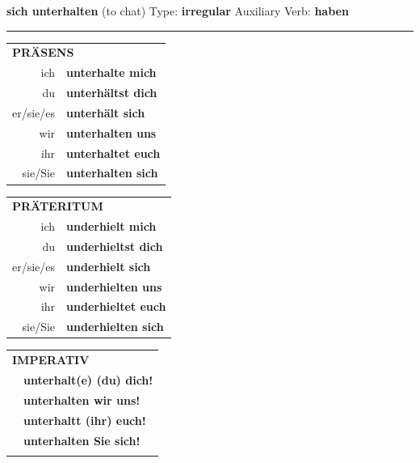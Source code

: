 \documentclass[10pt,a4paper]{revtex4-2}
\begin{document}
\begin{verbbox}
        {\Large \bf sich unterhalten} (to chat) \hfill Type: \textbf{irregular} \hfill Auxiliary Verb: \textbf{haben} 
    
       \vspace{5pt}

    \hrule
    
    \vspace{5pt}

  \begin{tabular}{rl}
     \multicolumn{2}{l}{\textbf{PRÄSENS} }\\
    ich & \textbf{unterhalte mich}\\
    du & \textbf{unterhältst dich}\\
    er/sie/es & \textbf{unterhält sich}\\
    wir & \textbf{unterhalten uns}\\
    ihr & \textbf{unterhaltet euch}\\
    sie/Sie & \textbf{unterhalten sich}\\
  \end{tabular}
  \hfill
     \begin{tabular}{rl}
    \multicolumn{2}{l}{\textbf{PRÄTERITUM} }\\
    ich & \textbf{underhielt mich}\\
    du & \textbf{underhieltst dich}\\
    er/sie/es & \textbf{underhielt sich}\\
    wir & \textbf{underhielten uns}\\
    ihr & \textbf{underhieltet euch}\\
    sie/Sie & \textbf{underhielten sich}\\
  \end{tabular}
  \hfill
  \begin{tabular}{rl}
     \multicolumn{2}{l}{\textbf{IMPERATIV} }\\
   & \textbf{unterhalt(e) (du) dich!}\\
   & \textbf{unterhalten wir uns!}\\
   & \textbf{unterhaltt (ihr) euch!}\\
   & \textbf{unterhalten Sie sich!}\\
   & \vspace{10pt}
  \end{tabular}

    \vspace{10pt}


\end{verbbox}
\end{document}
